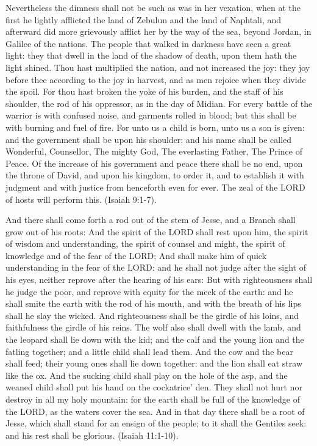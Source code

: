 \documentclass{article}
\begin{document}
Nevertheless the dimness shall not be such as was in her vexation, when
at the first he lightly afflicted the land of Zebulun and the land of Naphtali,
and afterward did more grievously afflict her by the way of the sea, beyond
Jordan, in Galilee of the nations. The people that walked in darkness have
seen a great light: they that dwell in the land of the shadow of death,
upon them hath the light shined. Thou hast multiplied the nation, and not
increased the joy: they joy before thee according to the joy in harvest,
and as men rejoice when they divide the spoil. For thou hast broken the
yoke of his burden, and the staff of his shoulder, the rod of his oppressor,
as in the day of Midian. For every battle of the warrior is with confused
noise, and garments rolled in blood; but this shall be with burning and
fuel of fire. For unto us a child is born, unto us a son is given: and
the government shall be upon his shoulder: and his name shall be called
Wonderful, Counsellor, The mighty God, The everlasting Father, The Prince
of Peace. Of the increase of his government and peace there shall be no
end, upon the throne of David, and upon his kingdom, to order it, and to
establish it with judgment and with justice from henceforth even for ever.
The zeal of the LORD of hosts will perform this. (Isaiah 9:1-7).

And there shall come forth a rod out of the stem of Jesse, and a Branch
shall grow out of his roots: And the spirit of the LORD shall rest upon
him, the spirit of wisdom and understanding, the spirit of counsel and
might, the spirit of knowledge and of the fear of the LORD; And shall make
him of quick understanding in the fear of the LORD: and he shall not judge
after the sight of his eyes, neither reprove after the hearing of his ears:
But with righteousness shall he judge the poor, and reprove with equity
for the meek of the earth: and he shall smite the earth with the rod of
his mouth, and with the breath of his lips shall he slay the wicked. And
righteousness shall be the girdle of his loins, and faithfulness the girdle
of his reins. The wolf also shall dwell with the lamb, and the leopard
shall lie down with the kid; and the calf and the young lion and the fatling
together; and a little child shall lead them. And the cow and the bear
shall feed; their young ones shall lie down together: and the lion shall
eat straw like the ox. And the sucking child shall play on the hole of
the asp, and the weaned child shall put his hand on the cockatrice' den.
They shall not hurt nor destroy in all my holy mountain: for the earth
shall be full of the knowledge of the LORD, as the waters cover the sea.
And in that day there shall be a root of Jesse, which shall stand for an
ensign of the people; to it shall the Gentiles seek: and his rest shall
be glorious. (Isaiah 11:1-10).
\end{document}
